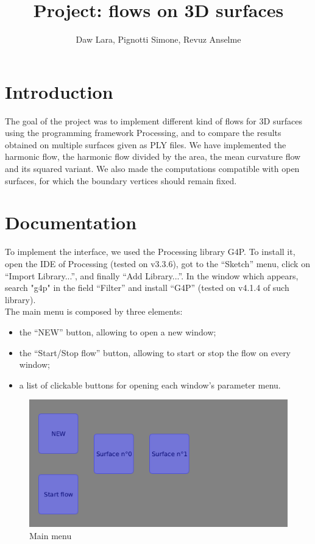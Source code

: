 \documentclass{article}
\title{Project: flows on 3D surfaces}
\author{Daw Lara, Pignotti Simone, Revuz Anselme}
\begin{document}
\maketitle

\section*{Introduction}
The goal of the project was to implement different kind of flows for 3D surfaces
using the programming framework Processing, and to compare the results obtained
on multiple surfaces given as PLY files. We have implemented the harmonic flow,
the harmonic flow divided by the area, the mean curvature flow and its squared
variant. We also made the computations compatible with open surfaces, for
which the boundary vertices should remain fixed.

\section*{Documentation}
To implement the interface, we used the Processing library G4P. To install it,
open the IDE of Processing (tested on v3.3.6), got to the ``Sketch'' menu, click on
``Import Library...'', and finally ``Add Library...''. In the window which appears,
search "g4p" in the field ``Filter'' and install ``G4P'' (tested on v4.1.4 of such library).\\

The main menu is composed by three elements:
\begin{itemize}
  \item the ``NEW'' button, allowing to open a new window;
  \item the ``Start/Stop flow'' button, allowing to start or stop the flow on every window;
  \item a list of clickable buttons for opening each window's parameter menu.
\end{itemize}

\begin{center}

\end{center}
\begin{figure}[h]
  \begin{center}
    \includegraphics[width=.5\textwidth]{img/main.png}
    \caption{Main menu}
    \label{fig:main}
  \end{center}
\end{figure}
\end{document}
